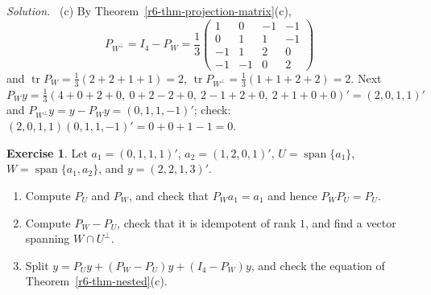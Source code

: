 \documentclass[12pt]{article}
\DeclareMathOperator{\tr}{tr}
\DeclareMathOperator{\Span}{span}
\theoremstyle{definition}
\newtheorem{exercise}{Exercise}
\newenvironment{solution}{\par\noindent\textit{Solution.}\ }{\par\smallskip}
\begin{document}
\begin{solution}
(c) By Theorem~\ref{r6-thm-projection-matrix}(c),
\[
P_{W^\perp}=I_4-P_W=\frac13\begin{pmatrix}1&0&-1&-1\\0&1&1&-1\\-1&1&2&0\\-1&-1&0&2\end{pmatrix}
\]
and \(\tr P_W=\frac13(2+2+1+1)=2\), \(\tr P_{W^\perp}=\frac13(1+1+2+2)=2\). Next
\(P_Wy=\frac13(4+0+2+0,\ 0+2-2+0,\ 2-1+2+0,\ 2+1+0+0)'=(2,0,1,1)'\) and
\(P_{W^\perp}y=y-P_Wy=(0,1,1,-1)'\); check: \((2,0,1,1)(0,1,1,-1)'=0+0+1-1=0\).
\end{solution}

\begin{exercise}\label{r6-dr-nested}
Let \(a_1=(0,1,1,1)'\), \(a_2=(1,2,0,1)'\), \(U=\Span\{a_1\}\), \(W=\Span\{a_1,a_2\}\), and \(y=(2,2,1,3)'\).
\begin{enumerate}
\item Compute \(P_U\) and \(P_W\), and check that \(P_Wa_1=a_1\) and hence \(P_WP_U=P_U\).
\item Compute \(P_W-P_U\), check that it is idempotent of rank \(1\), and find a vector spanning
\(W\cap U^\perp\).
\item Split \(y=P_Uy+(P_W-P_U)y+(I_4-P_W)y\), and check the equation of Theorem~\ref{r6-thm-nested}(c).
\end{enumerate}
\end{exercise}
\end{document}
